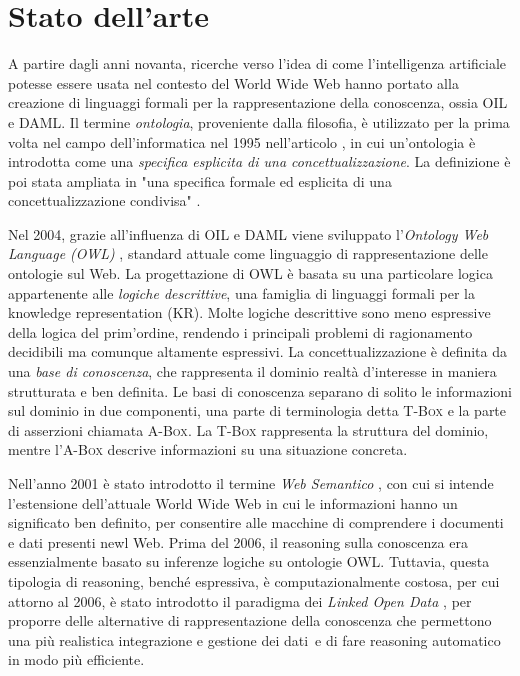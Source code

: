 \chapter[Stato dell'arte]{Stato dell'arte}
\label{chap:State-of-art}

\bvv
A partire dagli anni novanta, ricerche verso l'idea di come l'intelligenza artificiale potesse essere usata nel contesto del World Wide Web hanno portato alla creazione di linguaggi formali per la rappresentazione della conoscenza, ossia OIL e DAML. Il termine \textit{ontologia}, proveniente dalla filosofia, è utilizzato per la prima volta nel campo dell'informatica nel 1995 nell'articolo \cite{gruber1995}, in cui un'ontologia è introdotta come una \textit{specifica esplicita di una concettualizzazione}. La definizione è poi stata ampliata in "una specifica formale ed esplicita di una concettualizzazione condivisa" \cite{goy2015ontologies}. 

Nel 2004, grazie all'influenza di OIL e DAML viene sviluppato l'\textit{Ontology Web Language (OWL)} \cite{OWL}, standard attuale come linguaggio di rappresentazione delle ontologie sul Web. La progettazione di OWL è basata su una particolare logica appartenente alle \textit{logiche descrittive}, una famiglia di linguaggi formali per la knowledge representation (KR). Molte logiche descrittive sono meno espressive della logica del prim'ordine, rendendo i principali problemi di ragionamento decidibili ma comunque altamente espressivi. La concettualizzazione è definita da una \textit{base di conoscenza}, che rappresenta il dominio realtà d'interesse in maniera strutturata e ben definita. Le basi di conoscenza separano di solito le informazioni sul dominio in due componenti, una parte di terminologia detta \textsc{T-Box} e la parte di asserzioni chiamata \textsc{A-Box}. La \textsc{T-Box} rappresenta la struttura del dominio, mentre l'\textsc{A-Box} descrive informazioni su una situazione concreta.

\evv
Nell'anno 2001 è stato introdotto il termine \emph{Web Semantico} \cite{berners2001semantic}, \bvv con cui si intende l'estensione dell'attuale World Wide Web in cui le informazioni hanno un significato ben definito, per consentire alle macchine di comprendere i documenti e dati presenti newl Web\evv. Prima del 2006, il reasoning sulla conoscenza era essenzialmente basato su inferenze logiche su ontologie OWL. Tuttavia, questa tipologia di reasoning, benché espressiva, è computazionalmente costosa, per cui attorno al 2006, è stato introdotto il paradigma dei \textit{Linked Open Data} \cite{hitzler2021review}, per proporre delle alternative di rappresentazione della conoscenza che \bvv permettono una più realistica integrazione e gestione dei dati\evv\ e di fare reasoning automatico in modo più efficiente. 

